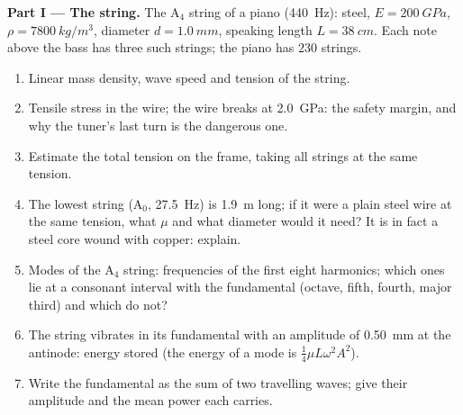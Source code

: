 \begin{problem}
\label{pb:b2:waves-on-strings:1}

\medskip
\noindent\textbf{Part I --- The string.}
The A$_4$ string of a piano (\qty{440}{Hz}): steel, $E = \qty{200}{GPa}$, $\rho =
\qty{7800}{kg/m^3}$, diameter $d = \qty{1.0}{mm}$, speaking length $L =
\qty{38}{cm}$. Each note above the bass has three such strings; the piano
has $230$ strings.
\begin{enumerate}
  \item Linear mass density, wave speed and tension of the string.
  \item Tensile stress in the wire; the wire breaks at \qty{2.0}{GPa}: the
        safety margin, and why the tuner's last turn is the dangerous
        one.
  \item Estimate the total tension on the frame, taking all strings
        at the same tension.
  \item The lowest string (A$_0$, \qty{27.5}{Hz}) is \qty{1.9}{m} long; if it
        were a plain steel wire at the same tension, what $\mu$ and
        what diameter would it need? It is in fact a steel core wound with
        copper: explain.
  \item Modes of the A$_4$ string: frequencies of the first eight
        harmonics; which ones lie at a consonant interval with the
        fundamental (octave, fifth, fourth, major third) and which do
        not?
  \item The string vibrates in its fundamental with an amplitude of
        \qty{0.50}{mm} at the antinode: energy stored (the energy of a
        mode is $\tfrac14\mu L\omega^2A^2$).
  \item Write the fundamental as the sum of two travelling waves; give
        their amplitude and the mean power each carries.
\end{enumerate}


\end{problem}
